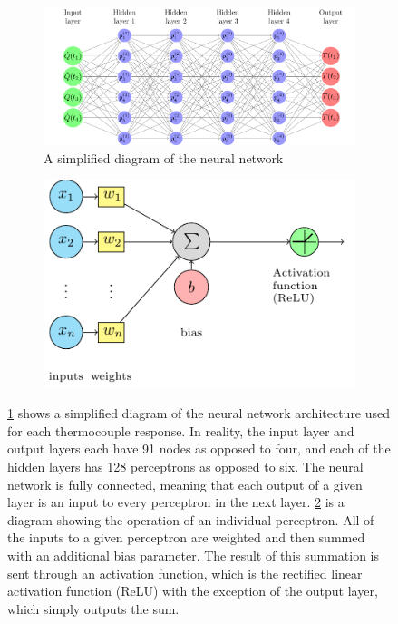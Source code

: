 \documentclass{article}
\begin{document}
\begin{figure}[htbp]
  \centering
  \begin{subfigure}[t]{.6\textwidth}
      \centering
      \includegraphics[width=\textwidth,keepaspectratio]{figures/neural_netowrk_diagram.pdf}
      \caption{A simplified diagram of the neural network   }
      \label{fig:neural_network_diagram}
  \end{subfigure}
  \begin{subfigure}[t]{.35\textwidth}
      \centering
      \includegraphics[width=\textwidth ,keepaspectratio]{figures/perceptron_diagram.pdf}
      \caption{}
      \label{fig:perceptron_diagram}
  \end{subfigure}
  \caption{\protect\ref{fig:neural_network_diagram} shows a simplified diagram of the neural network architecture used for each thermocouple response. In reality, the input layer and output layers each have 91 nodes as opposed to four, and each of the hidden layers has 128 perceptrons as opposed to six. The neural network is fully connected, meaning that each output of a given layer is an input to every perceptron in the next layer. \protect\ref{fig:perceptron_diagram} is a diagram showing the operation of an individual perceptron. All of the inputs to a given perceptron are weighted and then summed with an additional bias parameter. The result of this summation is sent through an activation function, which is the rectified linear activation function (ReLU) with the exception of the output layer, which simply outputs the sum.} 
  \label{fig:neural_network_drawings}
\end{figure}
\end{document}
